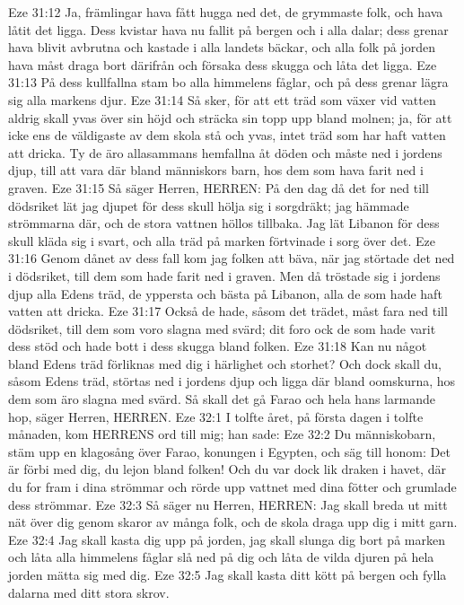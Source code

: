 Eze 31:12  Ja, främlingar hava fått hugga ned det, de grymmaste folk, och hava låtit det ligga. Dess kvistar hava nu fallit på bergen och i alla dalar; dess grenar hava blivit avbrutna och kastade i alla landets bäckar, och alla folk på jorden hava måst draga bort därifrån och försaka dess skugga och låta det ligga.
Eze 31:13  På dess kullfallna stam bo alla himmelens fåglar, och på dess grenar lägra sig alla markens djur.
Eze 31:14  Så sker, för att ett träd som växer vid vatten aldrig skall yvas över sin höjd och sträcka sin topp upp bland molnen; ja, för att icke ens de väldigaste av dem skola stå och yvas, intet träd som har haft vatten att dricka. Ty de äro allasammans hemfallna åt döden och måste ned i jordens djup, till att vara där bland människors barn, hos dem som hava farit ned i graven.
Eze 31:15  Så säger Herren, HERREN: På den dag då det for ned till dödsriket lät jag djupet för dess skull hölja sig i sorgdräkt; jag hämmade strömmarna där, och de stora vattnen höllos tillbaka. Jag lät Libanon för dess skull kläda sig i svart, och alla träd på marken förtvinade i sorg över det.
Eze 31:16  Genom dånet av dess fall kom jag folken att bäva, när jag störtade det ned i dödsriket, till dem som hade farit ned i graven. Men då tröstade sig i jordens djup alla Edens träd, de yppersta och bästa på Libanon, alla de som hade haft vatten att dricka.
Eze 31:17  Också de hade, såsom det trädet, måst fara ned till dödsriket, till dem som voro slagna med svärd; dit foro ock de som hade varit dess stöd och hade bott i dess skugga bland folken.
Eze 31:18  Kan nu något bland Edens träd förliknas med dig i härlighet och storhet? Och dock skall du, såsom Edens träd, störtas ned i jordens djup och ligga där bland oomskurna, hos dem som äro slagna med svärd. Så skall det gå Farao och hela hans larmande hop, säger Herren, HERREN.
Eze 32:1  I tolfte året, på första dagen i tolfte månaden, kom HERRENS ord till mig; han sade:
Eze 32:2  Du människobarn, stäm upp en klagosång över Farao, konungen i Egypten, och säg till honom: Det är förbi med dig, du lejon bland folken! Och du var dock lik draken i havet, där du for fram i dina strömmar och rörde upp vattnet med dina fötter och grumlade dess strömmar.
Eze 32:3  Så säger nu Herren, HERREN: Jag skall breda ut mitt nät över dig genom skaror av många folk, och de skola draga upp dig i mitt garn.
Eze 32:4  Jag skall kasta dig upp på jorden, jag skall slunga dig bort på marken och låta alla himmelens fåglar slå ned på dig och låta de vilda djuren på hela jorden mätta sig med dig.
Eze 32:5  Jag skall kasta ditt kött på bergen och fylla dalarna med ditt stora skrov.
